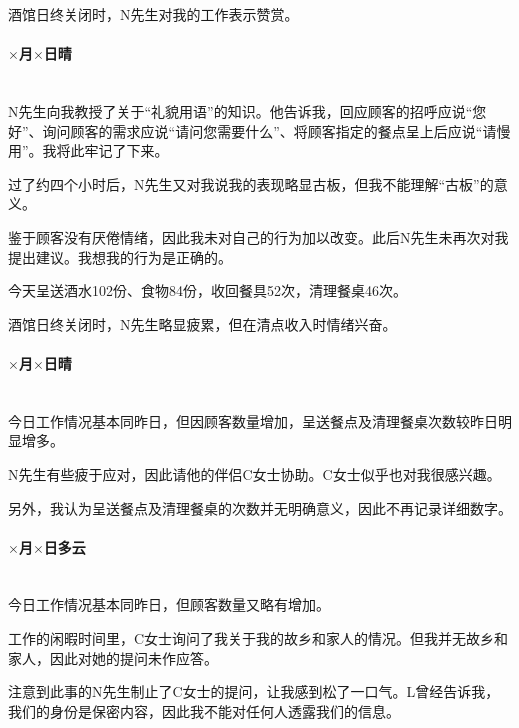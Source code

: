 酒馆日终关闭时，N先生对我的工作表示赞赏。

\par

\paragraph*{$\times$月$\times$日\quad 晴}\mbox{}\\

N先生向我教授了关于“礼貌用语”的知识。他告诉我，回应顾客的招呼应说“您好”、询问顾客的需求应说“请问您需要什么”、将顾客指定的餐点呈上后应说“请慢用”。我将此牢记了下来。

过了约四个小时后，N先生又对我说我的表现略显古板，但我不能理解“古板”的意义。

鉴于顾客没有厌倦情绪，因此我未对自己的行为加以改变。此后N先生未再次对我提出建议。我想我的行为是正确的。

今天呈送酒水102份、食物84份，收回餐具52次，清理餐桌46次。

酒馆日终关闭时，N先生略显疲累，但在清点收入时情绪兴奋。

\par

\paragraph*{$\times$月$\times$日\quad 晴}\mbox{}\\

今日工作情况基本同昨日，但因顾客数量增加，呈送餐点及清理餐桌次数较昨日明显增多。

N先生有些疲于应对，因此请他的伴侣C女士协助。C女士似乎也对我很感兴趣。

另外，我认为呈送餐点及清理餐桌的次数并无明确意义，因此不再记录详细数字。

\par

\paragraph*{$\times$月$\times$日\quad 多云}\mbox{}\\

今日工作情况基本同昨日，但顾客数量又略有增加。

工作的闲暇时间里，C女士询问了我关于我的故乡和家人的情况。但我并无故乡和家人，因此对她的提问未作应答。

注意到此事的N先生制止了C女士的提问，让我感到松了一口气。L曾经告诉我，我们的身份是保密内容，因此我不能对任何人透露我们的信息。

